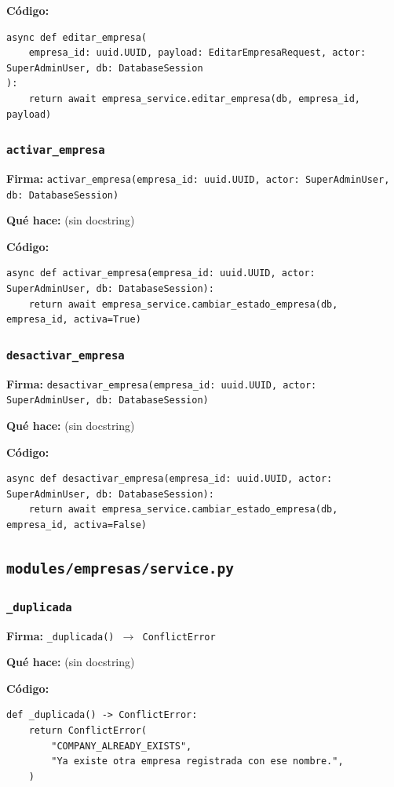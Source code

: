 \documentclass[11pt,a4paper]{article}
\begin{document}
\textbf{Código:}
\begin{lstlisting}
async def editar_empresa(
    empresa_id: uuid.UUID, payload: EditarEmpresaRequest, actor: SuperAdminUser, db: DatabaseSession
):
    return await empresa_service.editar_empresa(db, empresa_id, payload)
\end{lstlisting}

\subsubsection*{\texttt{activar\_empresa}}
\textbf{Firma:} \texttt{activar\_empresa(empresa\_id: uuid.UUID, actor: SuperAdminUser, db: DatabaseSession)}

\textbf{Qué hace:} (sin docstring)

\textbf{Código:}
\begin{lstlisting}
async def activar_empresa(empresa_id: uuid.UUID, actor: SuperAdminUser, db: DatabaseSession):
    return await empresa_service.cambiar_estado_empresa(db, empresa_id, activa=True)
\end{lstlisting}

\subsubsection*{\texttt{desactivar\_empresa}}
\textbf{Firma:} \texttt{desactivar\_empresa(empresa\_id: uuid.UUID, actor: SuperAdminUser, db: DatabaseSession)}

\textbf{Qué hace:} (sin docstring)

\textbf{Código:}
\begin{lstlisting}
async def desactivar_empresa(empresa_id: uuid.UUID, actor: SuperAdminUser, db: DatabaseSession):
    return await empresa_service.cambiar_estado_empresa(db, empresa_id, activa=False)
\end{lstlisting}

\subsection{\texttt{modules/empresas/service.py}}

\subsubsection*{\texttt{\_duplicada}}
\textbf{Firma:} \texttt{\_duplicada() $\rightarrow$ ConflictError}

\textbf{Qué hace:} (sin docstring)

\textbf{Código:}
\begin{lstlisting}
def _duplicada() -> ConflictError:
    return ConflictError(
        "COMPANY_ALREADY_EXISTS",
        "Ya existe otra empresa registrada con ese nombre.",
    )
\end{lstlisting}
\end{document}
